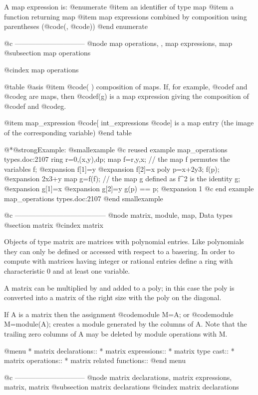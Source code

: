 {{{{{{A map expression is:
@enumerate
@item
an identifier of type map
@item
a function returning map
@item
map expressions combined by composition using parentheses (@code{(}, @code{)})
@end enumerate

@c ------------------------------
@node map operations,  , map expressions, map
@subsection map operations

@cindex map operations

@table @asis
@item @code{( )}
composition of maps. If, for example, @code{f} and @code{g} are maps,
then @code{f(g)} is a map expression giving the composition of @code{f}
and @code{g}.

@item map_expression @code{[} int_expressions @code{]}
is a map entry (the image of the corresponding variable)
@end table

@*@strong{Example:}
@smallexample
@c reused example map_operations types.doc:2107 
  ring r=0,(x,y),dp;
  map f=r,y,x;    // the map f permutes the variables
  f;
@expansion{} f[1]=y
@expansion{} f[2]=x
  poly p=x+2y3;
  f(p);
@expansion{} 2x3+y
  map g=f(f);    // the map g defined as  f^2 is the identity
  g;
@expansion{} g[1]=x
@expansion{} g[2]=y
  g(p) == p;
@expansion{} 1
@c end example map_operations types.doc:2107
@end smallexample

@c ---------------------------------------
@node matrix, module, map, Data types
@section matrix
@cindex matrix

Objects of type matrix are matrices with polynomial entries.
Like polynomials they can
only be defined or accessed with respect to a basering. In order to
compute with matrices having integer or rational entries define a ring
with characteristic 0 and at least one variable.

A matrix can be multiplied by and added to a poly; in this case the
poly is converted into a matrix of the right size with the poly on the
diagonal.

If A is a matrix then the assignment @code{module M=A;} or @code{module
M=module(A);} creates a module generated by the columns of A.  Note that
the trailing zero columns of A may be deleted by module operations with
M.

@menu
* matrix declarations::
* matrix expressions::
* matrix type cast::
* matrix operations::
* matrix related functions::
@end menu

@c ------------------------------
@node matrix declarations, matrix expressions, matrix, matrix
@subsection matrix declarations
@cindex matrix declarations

}}}}}}
